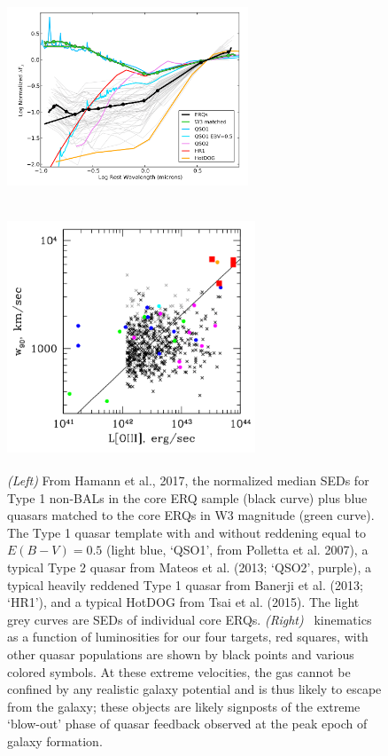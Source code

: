 \iffalse
\setcounter{figure}{1}
\hspace{-2.5cm}
\begin{figure}[h]
  \begin{center}
    \hspace{-0.5cm}
    \includegraphics[height=7.0cm,width=7.2cm,  trim={42pt 0pt 22pt 12pt},clip]{../Figures/Hamann2017_Fig16_SEDs.png}
    \includegraphics[height=7.1cm,width=7.4cm, trim={12pt 22pt 42pt 12pt},clip]{../Figures/Zakamska_2016_Fig9.png}
    \vspace{-10pt}
    \caption{
      \scriptsize
      {\it (Left)} From Hamann et al., 2017, the normalized median
      SEDs for Type 1 non-BALs in the core ERQ sample (black curve) plus
      blue quasars matched to the core ERQs in W3 magnitude (green curve).
      The Type 1 quasar template with and without reddening equal to $E(B-V)
      = 0.5$ (light blue, `QSO1', from Polletta et al. 2007), a typical Type
      2 quasar from Mateos et al. (2013; `QSO2', purple), a typical heavily
      reddened Type 1 quasar from Banerji et al. (2013; `HR1'), and a
      typical HotDOG from Tsai et al. (2015). The light grey curves are SEDs
      of individual core ERQs.
      {\it (Right)} \oiii\ kinematics as a function of luminosities
      for our four targets, red squares, with other quasar populations are
      shown by black points and various colored symbols.  At these extreme
      velocities, the gas cannot be confined by any realistic galaxy
      potential and is thus likely to escape from the galaxy; these objects
      are likely signposts of the extreme `blow-out' phase of quasar
      feedback observed at the peak epoch of galaxy formation.
    }
    \vspace{-14pt}
    \label{fig:ERQ_SED}
  \end{center}
\end{figure}
